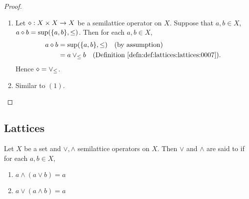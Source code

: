 \documentclass{book}
\begin{document}
	\begin{proof}\
		\begin{enumerate}
			\item 
			Let $\diamond: X \times X \rightarrow X$ be a semilattice operator on $X$. Suppose that $a,b \in X$, $a \diamond b = \sup (\{a,b\}, \leq)$. Then for each $a,b \in X$,
			\begin{align*}
				a \dmd b
				& = \sup (\{a,b\}, \leq) \quad \text{(by assumption)} \\
				& = a \vee_{\leq} b \quad \text{(\rd{def:lattices:lattices:0007})}.
			\end{align*}
			Hence $\diamond = \vee_{\leq}$. 
			\item Similar to $(1)$.
		\end{enumerate}
	\end{proof}
	
	
	
	
	
	
	
	
	
	
	
	
	
	
	
	
	
	
	
	
	
	
	
	
	
	
	
	
	
	
	
	
	
	
	
	
	
	
	
	
	
	
	
	
	
	
	
	
	
	
	
	
	
	
	
	\subsection{Lattices}
	
	\begin{defn} 
		Let $X$ be a set and $\vee, \wedge$ semilattice operators on $X$. Then $\vee$ and $\wedge$ are said to  if for each $a,b \in X$,
		\begin{enumerate}
			\item $a \wedge (a \vee b) = a$
			\item $a \vee (a \wedge b) = a$
		\end{enumerate} 
	\end{defn}
	
\end{document}
